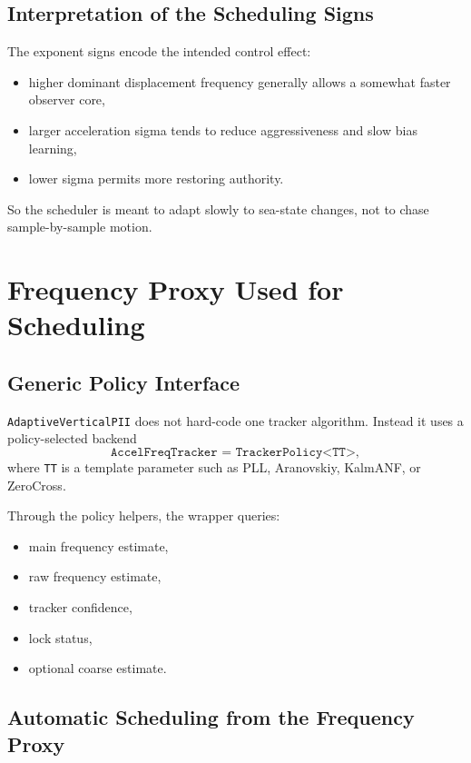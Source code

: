 \documentclass[conference]{IEEEtran}
\begin{document}
\subsection{Interpretation of the Scheduling Signs}

The exponent signs encode the intended control effect:
\begin{itemize}[leftmargin=1.4em]
  \item higher dominant displacement frequency generally allows a somewhat
        faster observer core,
  \item larger acceleration sigma tends to reduce aggressiveness and slow bias
        learning,
  \item lower sigma permits more restoring authority.
\end{itemize}

So the scheduler is meant to adapt slowly to sea-state changes, not to chase
sample-by-sample motion.

\section{Frequency Proxy Used for Scheduling}\label{sec:freq_proxy}

\subsection{Generic Policy Interface}

\texttt{AdaptiveVerticalPII} does not hard-code one tracker algorithm.
Instead it uses a policy-selected backend
\begin{equation}
\texttt{AccelFreqTracker = TrackerPolicy<TT>},
\end{equation}
where \texttt{TT} is a template parameter such as PLL, Aranovskiy, KalmANF,
or ZeroCross.

Through the policy helpers, the wrapper queries:
\begin{itemize}[leftmargin=1.4em]
  \item main frequency estimate,
  \item raw frequency estimate,
  \item tracker confidence,
  \item lock status,
  \item optional coarse estimate.
\end{itemize}

\subsection{Automatic Scheduling from the Frequency Proxy}
\end{document}
